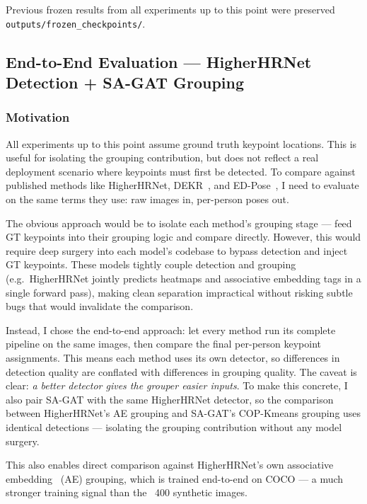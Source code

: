 Previous frozen results from all experiments up to this point were preserved \texttt{outputs/frozen\_checkpoints/}.


\subsection{End-to-End Evaluation --- HigherHRNet~\cite{cheng2020higherhrnet} Detection + SA-GAT Grouping}

\subsubsection{Motivation}

All experiments up to this point assume ground truth keypoint locations. This is useful for isolating the grouping contribution, but does not reflect a real deployment scenario where keypoints must first be detected. To compare against published methods like HigherHRNet, DEKR~\cite{geng2021dekr}, and ED-Pose~\cite{yang2023edpose}, I need to evaluate on the same terms they use: raw images in, per-person poses out.

The obvious approach would be to isolate each method's grouping stage --- feed GT keypoints into their grouping logic and compare directly. However, this would require deep surgery into each model's codebase to bypass detection and inject GT keypoints. These models tightly couple detection and grouping (e.g.\ HigherHRNet jointly predicts heatmaps and associative embedding tags in a single forward pass), making clean separation impractical without risking subtle bugs that would invalidate the comparison.

Instead, I chose the end-to-end approach: let every method run its complete pipeline on the same images, then compare the final per-person keypoint assignments. This means each method uses its own detector, so differences in detection quality are conflated with differences in grouping quality. The caveat is clear: \emph{a better detector gives the grouper easier inputs}. To make this concrete, I also pair SA-GAT with the same HigherHRNet detector, so the comparison between HigherHRNet's AE grouping and SA-GAT's COP-Kmeans grouping uses identical detections --- isolating the grouping contribution without any model surgery.

This also enables direct comparison against HigherHRNet's own associative embedding~\cite{newell2017associative} (AE) grouping, which is trained end-to-end on COCO --- a much stronger training signal than the ~400 synthetic images.

